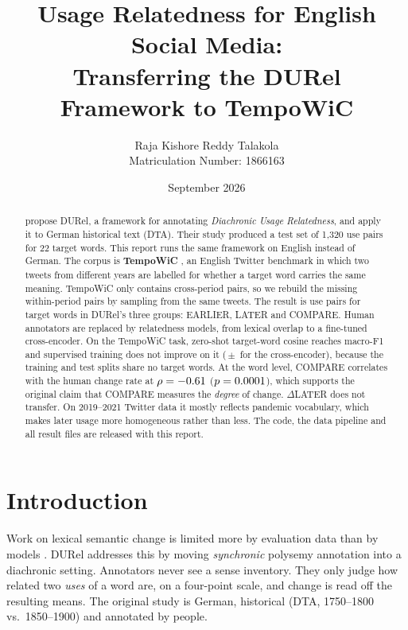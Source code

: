 \documentclass{article}
\title{Usage Relatedness for English Social Media:\\
Transferring the DURel Framework to TempoWiC}
\author{
  Raja Kishore Reddy Talakola \\
  Matriculation Number: 1866163 \\
}
\date{September 2026}
\newif\iffirstsectiondone
\let\originalsection\section
\renewcommand{\section}{%
  \iffirstsectiondone\Needspace*{0.12\textheight}\else\firstsectiondonetrue\fi
  \originalsection}
\begin{document}
\maketitle

\begin{abstract}
\citet{schlechtweg2018durel} propose DURel, a framework for annotating
\emph{Diachronic Usage Relatedness}, and apply it to German historical text
(DTA). Their study produced a test set of 1{,}320 use pairs for 22 target words.
This report runs the same framework on English instead of German. The corpus is
\textbf{TempoWiC} \citep{loureiro2022tempowic}, an English Twitter benchmark in
which two tweets from different years are labelled for whether a target word
carries the same meaning. TempoWiC only contains cross-period pairs, so we
rebuild the missing within-period pairs by sampling from the same tweets. The
result is \numTotalPairs{} use pairs for \numWords{} target words in DURel's
three groups: EARLIER, LATER and COMPARE. Human annotators are replaced by
relatedness models, from lexical overlap to a fine-tuned cross-encoder. On the
TempoWiC task, zero-shot target-word cosine reaches
\zsF{} macro-F1 and supervised training does not improve on it
(\ftF{}\,$\pm$\,\ftFsd{} for the cross-encoder), because the training and test
splits share no target words. At the word level, COMPARE correlates with the
human change rate at $\rho=-0.61$ ($p=0.0001$), which supports the
original claim that COMPARE measures the \emph{degree} of change. $\Delta$LATER
does not transfer. On 2019--2021 Twitter data it mostly reflects pandemic
vocabulary, which makes later usage more homogeneous rather than less. The code,
the data pipeline and all result files are released with this report.
\end{abstract}

\section{Introduction}

Work on lexical semantic change is limited more by evaluation data than by
models \citep{schlechtweg2018durel}. DURel addresses this by moving
\emph{synchronic} polysemy annotation into a diachronic setting. Annotators
never see a sense inventory. They only judge how related two \emph{uses} of a
word are, on a four-point scale, and change is read off the resulting means. The
original study is German, historical (DTA, 1750--1800 vs.\ 1850--1900) and
annotated by people.
\end{document}
